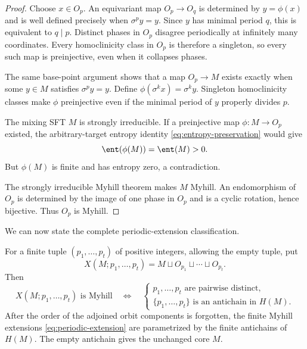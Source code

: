 \begin{proof}
Choose $x\in O_p$.  An equivariant map $O_p\to O_q$ is determined by
$y=\phi(x)$ and is well defined precisely when $\sigma^p y=y$.  Since $y$ has
minimal period $q$, this is equivalent to $q\mid p$.  Distinct phases in
$O_p$ disagree periodically at infinitely many coordinates.  Every
homoclinicity class in $O_p$ is therefore a singleton, so every such map is
preinjective, even when it collapses phases.

The same base-point argument shows that a map $O_p\to M$ exists exactly when
some $y\in M$ satisfies $\sigma^p y=y$.  Define
$\phi(\sigma^k x)=\sigma^k y$.  Singleton homoclinicity classes make $\phi$
preinjective even if the minimal period of $y$ properly divides $p$.

The mixing SFT $M$ is strongly irreducible.  If a preinjective map
$\phi:M\to O_p$ existed, the arbitrary-target entropy identity
\eqref{eq:entropy-preservation} would give
\[
  \ent(\phi(M))=\ent(M)>0.
\]
But $\phi(M)$ is finite and has entropy zero, a contradiction.

The strongly irreducible Myhill theorem makes $M$ Myhill.  An endomorphism of
$O_p$ is determined by the image of one phase in $O_p$ and is a cyclic
rotation, hence bijective.  Thus $O_p$ is Myhill.
\end{proof}

We can now state the complete periodic-extension classification.

\begin{theorem}
\label{thm:antichain}
For a finite tuple $(p_1,\ldots,p_t)$ of positive integers, allowing the empty
tuple, put
\begin{equation}
 X(M;p_1,\ldots,p_t)
 =M\sqcup O_{p_1}\sqcup\cdots\sqcup O_{p_t}.
 \label{eq:periodic-extension}
\end{equation}
Then
\begin{equation}
 X(M;p_1,\ldots,p_t)\text{ is Myhill}
 \quad\Longleftrightarrow\quad
 \begin{cases}
 p_1,\ldots,p_t\text{ are pairwise distinct},\\
 \{p_1,\ldots,p_t\}\text{ is an antichain in }H(M).
 \end{cases}
 \label{eq:antichain-iff}
\end{equation}
After the order of the adjoined orbit components is forgotten, the finite
Myhill extensions \eqref{eq:periodic-extension} are parametrized by the finite
antichains of $H(M)$.  The empty antichain gives the unchanged core $M$.
\end{theorem}

